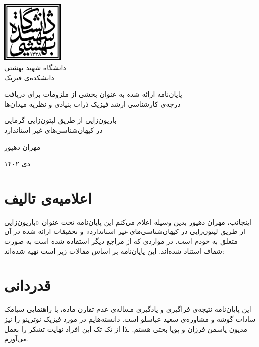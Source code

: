 \documentclass[a4paper]{book}
\author{}
\title{}
\date{}
\begin{document}

\begin{titlepage}
	\thispagestyle{empty}
	\centering
	{\includegraphics[height=3cm]{./logo}\\دانشگاه شهید بهشتی\\دانشکده‌ی فیزیک \par}
	\vspace{1cm}
	{
پایان‌نامه‌ ارائه شده به عنوان بخشی از ملزومات برای دریافت\\درجه‌ی کارشناسی ارشد فیزیک ذرات بنیادی و نظریه میدان‌ها 
	\par}
	\vspace{1cm}
	{\huge 
باریون‌زایی از طریق لپتون‌زایی گرمایی\\در کیهان‌شناسی‌های غیر استاندارد
	\par}
	\vspace{1cm}
	{\large
مهران دهپور
	\par}
	\vfill
	{\large
دی ۱۴۰۲
	\par}
\end{titlepage}
\restoregeometry

\chapter*{اعلامیه‌ی تالیف}
اینجانب، مهران دهپور بدین وسیله اعلام می‌کنم این پایان‌نامه تحت عنوان «باریون‌زایی از طریق لپتون‌زایی در کیهان‌شناسی‌های غیر استاندارد» و تحقیقات ارائه شده در آن متعلق به خودم است. در مواردی که از مراجع دیگر استفاده شده است به صورت شفاف استناد شده‌اند. 
این پایان‌نامه بر اساس مقالات زیر است تهیه شده‌اند:
\par
\vspace{-0.5cm}

\chapter*{قدردانی}
این پایان‌نامه نتیجه‌ی فراگیری و یادگیری مساله‌ی عدم تقارن ماده، با راهنمایی سیامک سادات گوشه و مشاوره‌ی سعید عباسلو است. دانسته‌هایم در مورد فیزیک نوترینو را نیز مدیون یاسمن فرزان و پویا بختی هستم.  لذا از تک تک این افراد نهایت تشکر را بعمل می‌آورم.
\end{document}
